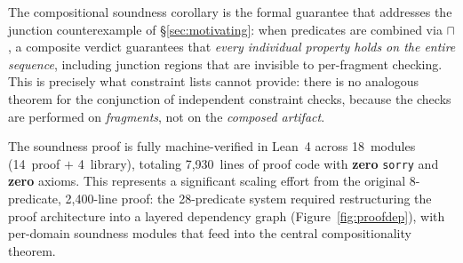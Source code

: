 \noindent The compositional soundness corollary is the formal
guarantee that addresses the junction counterexample of
\S\ref{sec:motivating}: when predicates are combined via $\sqcap$,
a composite \PASS{} verdict guarantees that \emph{every individual
property holds on the entire sequence}, including junction regions
that are invisible to per-fragment checking.
This is precisely what constraint lists cannot provide: there is no
analogous theorem for the conjunction of independent constraint checks,
because the checks are performed on \emph{fragments}, not on the
\emph{composed artifact}.

The soundness proof is fully machine-verified in Lean~4 across
18~modules (14~proof $+$ 4~library), totaling 7,930~lines of proof
code with \textbf{zero} \texttt{sorry} and \textbf{zero} axioms.
This represents a significant scaling effort from the original 8-predicate,
2,400-line proof: the 28-predicate system required restructuring the
proof architecture into a layered dependency graph
(Figure~\ref{fig:proofdep}), with per-domain soundness modules that
feed into the central compositionality theorem.

